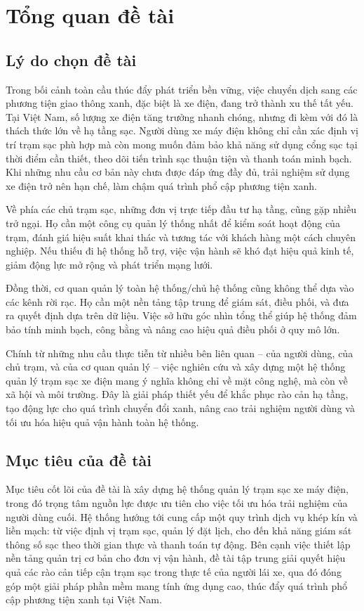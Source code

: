 \section{Tổng quan đề tài}

\subsection{Lý do chọn đề tài}
    Trong bối cảnh toàn cầu thúc đẩy phát triển bền vững, việc chuyển dịch sang các phương tiện giao thông xanh, đặc biệt là xe điện, đang trở thành xu thế tất yếu. Tại Việt Nam, số lượng xe điện tăng trưởng nhanh chóng, nhưng đi kèm với đó là thách thức lớn về hạ tầng sạc. Người dùng xe máy điện không chỉ cần xác định vị trí trạm sạc phù hợp mà còn mong muốn đảm bảo khả năng sử dụng cổng sạc tại thời điểm cần thiết, theo dõi tiến trình sạc thuận tiện và thanh toán minh bạch. Khi những nhu cầu cơ bản này chưa được đáp ứng đầy đủ, trải nghiệm sử dụng xe điện trở nên hạn chế, làm chậm quá trình phổ cập phương tiện xanh.
\par
    Về phía các chủ trạm sạc, những đơn vị trực tiếp đầu tư hạ tầng, cũng gặp nhiều trở ngại. Họ cần một công cụ quản lý thống nhất để kiểm soát hoạt động của trạm, đánh giá hiệu suất khai thác và tương tác với khách hàng một cách chuyên nghiệp. Nếu thiếu đi hệ thống hỗ trợ, việc vận hành sẽ khó đạt hiệu quả kinh tế, giảm động lực mở rộng và phát triển mạng lưới.
\par
    Đồng thời, cơ quan quản lý toàn hệ thống/chủ hệ thống cũng không thể dựa vào các kênh rời rạc. Họ cần một nền tảng tập trung để giám sát, điều phối, và đưa ra quyết định dựa trên dữ liệu. Việc sở hữu góc nhìn tổng thể giúp hệ thống đảm bảo tính minh bạch, công bằng và nâng cao hiệu quả điều phối ở quy mô lớn.
\par 
    Chính từ những nhu cầu thực tiễn từ nhiều bên liên quan -- của người dùng, của chủ trạm, và của cơ quan quản lý -- việc nghiên cứu và xây dựng một hệ thống quản lý trạm sạc xe điện mang ý nghĩa không chỉ về mặt công nghệ, mà còn về xã hội và môi trường. Đây là giải pháp thiết yếu để khắc phục rào cản hạ tầng, tạo động lực cho quá trình chuyển đổi xanh, nâng cao trải nghiệm người dùng và tối ưu hóa hiệu quả vận hành toàn hệ thống.

\subsection{Mục tiêu của đề tài}
    Mục tiêu cốt lõi của đề tài là xây dựng hệ thống quản lý trạm sạc xe máy điện, trong đó trọng tâm nguồn lực được ưu tiên cho việc tối ưu hóa trải nghiệm của người dùng cuối. Hệ thống hướng tới cung cấp một quy trình dịch vụ khép kín và liền mạch: từ việc định vị trạm sạc, quản lý đặt lịch, cho đến khả năng giám sát thông số sạc theo thời gian thực và thanh toán tự động. Bên cạnh việc thiết lập nền tảng quản trị cơ bản cho đơn vị vận hành, đề tài tập trung giải quyết hiệu quả các rào cản tiếp cận trạm sạc trong thực tế của người lái xe, qua đó đóng góp một giải pháp phần mềm mang tính ứng dụng cao, thúc đẩy quá trình phổ cập phương tiện xanh tại Việt Nam.

